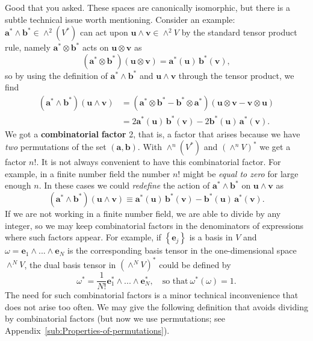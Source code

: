 Good that you asked. These spaces are canonically isomorphic, but
there is a subtle technical issue worth mentioning. Consider an example:
$\mathbf{a}^{*}\wedge\mathbf{b}^{*}\in\wedge^{2}(V^{*})$ can act
upon $\mathbf{u}\wedge\mathbf{v}\in\wedge^{2}V$ by the standard tensor
product rule, namely $\mathbf{a}^{*}\otimes\mathbf{b}^{*}$ acts on
$\mathbf{u}\otimes\mathbf{v}$ as \[
\left(\mathbf{a}^{*}\otimes\mathbf{b}^{*}\right)\left(\mathbf{u}\otimes\mathbf{v}\right)=\mathbf{a}^{*}(\mathbf{u})\,\mathbf{b}^{*}(\mathbf{v}),\]
so by using the definition of $\mathbf{a}^{*}\wedge\mathbf{b}^{*}$
and $\mathbf{u}\wedge\mathbf{v}$ through the tensor product, we find\begin{align*}
\left(\mathbf{a}^{*}\wedge\mathbf{b}^{*}\right)\left(\mathbf{u}\wedge\mathbf{v}\right) & =\left(\mathbf{a}^{*}\otimes\mathbf{b}^{*}-\mathbf{b}^{*}\otimes\mathbf{a}^{*}\right)\left(\mathbf{u}\otimes\mathbf{v}-\mathbf{v}\otimes\mathbf{u}\right)\\
 & =2\mathbf{a}^{*}(\mathbf{u})\,\mathbf{b}^{*}(\mathbf{v})-2\mathbf{b}^{*}(\mathbf{u})\,\mathbf{a}^{*}(\mathbf{v}).\end{align*}
We got a \textbf{combinatorial} \textbf{factor}
2, that is, a factor that arises because we have \emph{two} permutations
of the set $\left(\mathbf{a},\mathbf{b}\right)$. With $\wedge^{n}\left(V^{*}\right)$
and $\left(\wedge^{n}V\right)^{*}$ we get a factor $n!$. It is not
always convenient to have this combinatorial factor. For example,
in a finite number field the number $n!$ might be \emph{equal to
zero} for large enough $n$. In these cases we could \emph{redefine}
the action of $\mathbf{a}^{*}\wedge\mathbf{b}^{*}$ on $\mathbf{u}\wedge\mathbf{v}$
as \[
\left(\mathbf{a}^{*}\wedge\mathbf{b}^{*}\right)\left(\mathbf{u}\wedge\mathbf{v}\right)\equiv\mathbf{a}^{*}(\mathbf{u})\,\mathbf{b}^{*}(\mathbf{v})-\mathbf{b}^{*}(\mathbf{u})\,\mathbf{a}^{*}(\mathbf{v}).\]
 If we are not working in a finite number field, we are able to divide
by any integer, so we may keep combinatorial factors in the denominators
of expressions where such factors appear. For example, if $\left\{ \mathbf{e}_{j}\right\} $
is a basis in $V$ and $\omega=\mathbf{e}_{1}\wedge...\wedge\mathbf{e}_{N}$
is the corresponding basis tensor in the one-dimen\-sion\-al space
$\wedge^{N}V$, the dual basis tensor in $\left(\wedge^{N}V\right)^{*}$
could be defined by \[
\omega^{*}=\frac{1}{N!}\mathbf{e}_{1}^{*}\wedge...\wedge\mathbf{e}_{N}^{*},\quad\text{so that}\:\omega^{*}(\omega)=1.\]
The need for such combinatorial factors is a minor technical inconvenience
that does not arise too often. We may give the following definition
that avoids dividing by combinatorial factors (but now we use permutations;
see Appendix~\ref{sub:Properties-of-permutations}).


